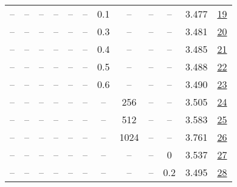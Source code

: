 \begin{table}[H]
\begin{tabular}{cccccccccccc}
-- & -- & -- & -- & -- & -- & 0.1 & -- & -- & -- & 3.477 & \href{https://wandb.ai/stanford-mercury/optimizer-scaling/runs/sweep-130m-2B-scion840d88lr0.016-wd0.1-minlr0-warmup0-b10.95-gn1-61f5f7}{19} \\
-- & -- & -- & -- & -- & -- & 0.3 & -- & -- & -- & 3.481 & \href{https://wandb.ai/stanford-mercury/optimizer-scaling/runs/sweep-130m-2B-scion8e26felr0.016-wd0.1-minlr0-warmup0-b10.95-gn1-382d16}{20} \\
-- & -- & -- & -- & -- & -- & 0.4 & -- & -- & -- & 3.485 & \href{https://wandb.ai/stanford-mercury/optimizer-scaling/runs/sweep-130m-2B-scionf020a1lr0.016-wd0.1-minlr0-warmup0-b10.95-gn1-f5cf5d}{21} \\
-- & -- & -- & -- & -- & -- & 0.5 & -- & -- & -- & 3.488 & \href{https://wandb.ai/stanford-mercury/optimizer-scaling/runs/sweep-130m-2B-sciona0879alr0.016-wd0.1-minlr0-warmup0-b10.95-gn1-99b18a}{22} \\
-- & -- & -- & -- & -- & -- & 0.6 & -- & -- & -- & 3.490 & \href{https://wandb.ai/stanford-mercury/optimizer-scaling/runs/sweep-130m-2B-scion4bb4a4lr0.016-wd0.1-minlr0-warmup0-b10.95-gn1-e076fe}{23} \\
-- & -- & -- & -- & -- & -- & -- & 256 & -- & -- & 3.505 & \href{https://wandb.ai/stanford-mercury/optimizer-scaling/runs/sweep-130m-2B-scion5a7263lr0.016-wd0.1-minlr0-warmup0-b10.95-gn1-4dcd4d}{24} \\
-- & -- & -- & -- & -- & -- & -- & 512 & -- & -- & 3.583 & \href{https://wandb.ai/stanford-mercury/optimizer-scaling/runs/sweep-130m-2B-scionb67125lr0.016-wd0.1-minlr0-warmup0-b10.95-gn1-debbed}{25} \\
-- & -- & -- & -- & -- & -- & -- & 1024 & -- & -- & 3.761 & \href{https://wandb.ai/stanford-mercury/optimizer-scaling/runs/sweep-130m-2B-scionb3e82dlr0.016-wd0.1-minlr0-warmup0-b10.95-gn1-8a367e}{26} \\
-- & -- & -- & -- & -- & -- & -- & -- & -- & 0 & 3.537 & \href{https://wandb.ai/stanford-mercury/optimizer-scaling/runs/sweep-130m-2B-scion5931c7lr0.016-wd0-minlr0-warmup0-b10.95-gn1-s-e03372}{27} \\
-- & -- & -- & -- & -- & -- & -- & -- & -- & 0.2 & 3.495 & \href{https://wandb.ai/stanford-mercury/optimizer-scaling/runs/sweep-130m-2B-scion6d1cdflr0.016-wd0.2-minlr0-warmup0-b10.95-gn1-78231c}{28} \\
\bottomrule
\end{tabular}
\end{table}

